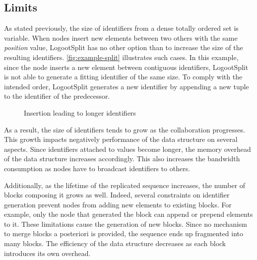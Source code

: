 \documentclass[sigplan,10pt,authorversion]{acmart}
\newcommand{\trm}[1]{\mathit{#1}}
\newcommand{\id}[3]{$\trm{#1}^{\trm{#2}}_{\trm{#3}}$}
\newcommand{\widthletter}{7mm}
\begin{document}
\subsection{Limits}

As stated previously, the size of identifiers from a dense totally ordered set is variable.
When nodes insert new elements between two others with the same \emph{position} value, LogootSplit has no other option than to increase the size of the resulting identifiers.
\autoref{fig:example-split} illustrates such cases.
In this example, since the node inserts a new element between contiguous identifiers, LogootSplit is not able to generate a fitting identifier of the same size.
To comply with the intended order, LogootSplit generates a new identifier by appending a new tuple to the identifier of the predecessor.

\begin{figure}[ht!]
    \centering
    \caption{Insertion leading to longer identifiers}
    \label{fig:example-split}
\end{figure}

As a result, the size of identifiers tends to grow as the collaboration progresses.
This growth impacts negatively performance of the data structure on several aspects.
Since identifiers attached to values become longer, the memory overhead of the data structure increases accordingly.
This also increases the bandwidth consumption as nodes have to broadcast identifiers to others.

Additionally, as the lifetime of the replicated sequence increases, the number of blocks composing it grows as well.
Indeed, several constraints on identifier generation prevent nodes from adding new elements to existing blocks.
For example, only the node that generated the block can append or prepend elements to it.
These limitations cause the generation of new blocks.
Since no mechanism to merge blocks a posteriori is provided, the sequence ends up fragmented into many blocks.
The efficiency of the data structure decreases as each block introduces its own overhead.
\end{document}
